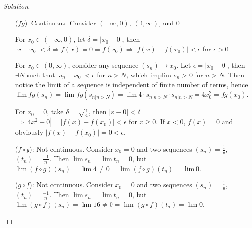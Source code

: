 \documentclass{article}
\renewcommand*{\implies}{\ensuremath{\Longrightarrow}}
\begin{document}
\begin{enumerate}[label=(\alph*)]
\begin{proof}[Solution]
\begin{enumerate}
            \item [($fg$):] Continuous. Consider $(-\infty,0)$, $(0,\infty)$, and $0$. 
            
            For $x_0\in (-\infty,0)$, let $\delta = |x_0-0|$, then $|x-x_0|<\delta\implies f(x)=0=f(x_0)
            \implies |f(x)-f(x_0)|<\epsilon$ for $\epsilon>0$. 
            
            For $x_0\in (0,\infty)$, consider any sequence $(s_n)\to x_0$. Let $\epsilon = |x_0-0|$, 
            then $\exists N$ such that $|s_n-x_0|<\epsilon$ for $n>N$, which implies $s_n>0$ for 
            $n>N$. Then notice the limit of a sequence is independent of finite number of terms, 
            hence $\lim fg(s_n) = \lim fg(s_{n|n>N}) = \lim 4\cdot s_{n|n>N}\cdot s_{n|n>N} 
            = 4x_0^2 = fg(x_0)$.

            For $x_0 = 0$, take $\delta = \sqrt{\frac{\epsilon}{4}}$, then $|x-0|<\delta$ 
            $\implies |4x^2-0|=|f(x)-f(x_0)|<\epsilon$ for $x\ge 0$. If $x<0$, $f(x)=0$ and 
            obviously $|f(x)-f(x_0)|=0<\epsilon$.

            \item [($f\circ g$):] Not continuous. Consider $x_0=0$ and two sequences
            $(s_n)=\frac{1}{n}$, $(t_n)=\frac{-1}{n}$. Then $\lim s_n=\lim t_n=0$, but
            $\lim (f\circ g)(s_n)=\lim 4\neq 0=\lim (f\circ g)(t_n) = \lim 0$.

            \item [($g\circ f$):] Not continuous. Consider $x_0=0$ and two sequences
            $(s_n)=\frac{1}{n}$, $(t_n)=\frac{-1}{n}$. Then $\lim s_n=\lim t_n=0$, but
            $\lim (g\circ f)(s_n)=\lim 16\neq 0=\lim (g\circ f)(t_n) = \lim 0$.
        \end{enumerate}
        
    \end{proof}
\end{enumerate}
\end{document}
